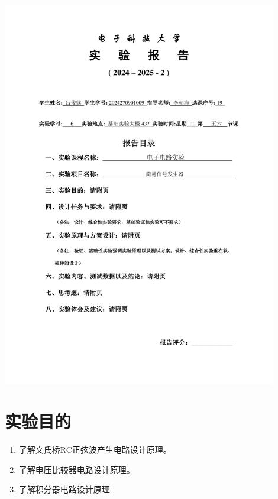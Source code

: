 \documentclass[10pt, a4paper]{article} %
\begin{document}
\begin{titlepage}
    \centering
    \includegraphics[page=1, width=0.9\textwidth, keepaspectratio]{image/实验报告撰写封面.pdf}
    \restoregeometry
\end{titlepage}

\setcounter{section}{2}

\section{实验目的}

\begin{enumerate}[leftmargin=50pt,label=(\arabic*)] %
    \item 了解文氏桥RC正弦波产生电路设计原理。
    \item 了解电压比较器电路设计原理。
    \item 了解积分器电路设计原理
\end{enumerate}
\end{document}
